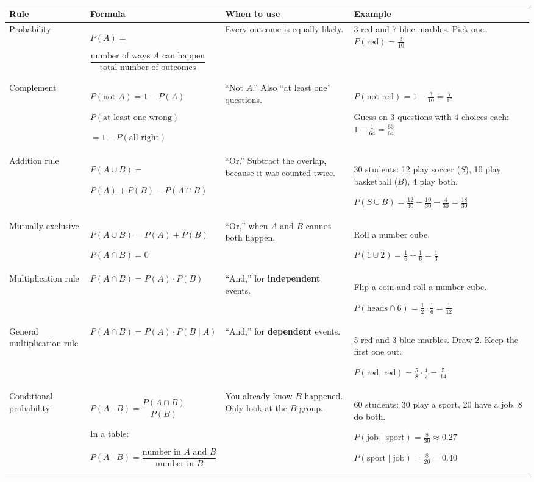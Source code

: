 \documentclass[11pt]{article}
\newcommand{\sumhead}[1]{\par\vspace{0.7em}{\large\bfseries #1}\par\vspace{0.3em}}
\begin{document}
\sumhead{Probability Rules}
\begin{tabular}{|L{0.95in}|L{2.1in}|L{1.43in}|L{2.05in}|}\hline
\textbf{Rule} & \textbf{Formula} & \textbf{When to use} & \textbf{Example}\\ \hline
Probability & $P(A) =$\par $\dfrac{\text{number of ways } A \text{ can happen}}{\text{total number of outcomes}}$ & Every outcome is equally likely. & 3 red and 7 blue marbles. Pick one. $P(\text{red}) = \frac{3}{10}$\\ \hline
Complement & $P(\text{not } A) = 1 - P(A)$\par $P(\text{at least one wrong})$\par $= 1 - P(\text{all right})$ & ``Not $A$.'' Also ``at least one'' questions. & $P(\text{not red}) = 1 - \frac{3}{10} = \frac{7}{10}$\par Guess on 3 questions with 4 choices each: $1 - \frac{1}{64} = \frac{63}{64}$\\ \hline
Addition rule & $P(A \cup B) =$\par $P(A) + P(B) - P(A \cap B)$ & ``Or.'' Subtract the overlap, because it was counted twice. & 30 students: 12 play soccer ($S$), 10 play basketball ($B$), 4 play both.\par $P(S \cup B) = \frac{12}{30} + \frac{10}{30} - \frac{4}{30} = \frac{18}{30}$\\ \hline
Mutually exclusive & $P(A \cup B) = P(A) + P(B)$\par $P(A \cap B) = 0$ & ``Or,'' when $A$ and $B$ cannot both happen. & Roll a number cube.\par $P(1 \cup 2) = \frac{1}{6} + \frac{1}{6} = \frac{1}{3}$\\ \hline
Multiplication rule & $P(A \cap B) = P(A) \cdot P(B)$ & ``And,'' for \textbf{independent} events. & Flip a coin and roll a number cube.\par $P(\text{heads} \cap 6) = \frac{1}{2} \cdot \frac{1}{6} = \frac{1}{12}$\\ \hline
General multiplication rule & $P(A \cap B) = P(A) \cdot P(B \mid A)$ & ``And,'' for \textbf{dependent} events. & 5 red and 3 blue marbles. Draw 2. Keep the first one out.\par $P(\text{red, red}) = \frac{5}{8} \cdot \frac{4}{7} = \frac{5}{14}$\\ \hline
Conditional probability & $P(A \mid B) = \dfrac{P(A \cap B)}{P(B)}$\par In a table:\par $P(A \mid B) = \dfrac{\text{number in } A \text{ and } B}{\text{number in } B}$ & You already know $B$ happened. Only look at the $B$ group. & 60 students: 30 play a sport, 20 have a job, 8 do both.\par $P(\text{job} \mid \text{sport}) = \frac{8}{30} \approx 0.27$\par $P(\text{sport} \mid \text{job}) = \frac{8}{20} = 0.40$\\ \hline

\end{tabular}
\end{document}
